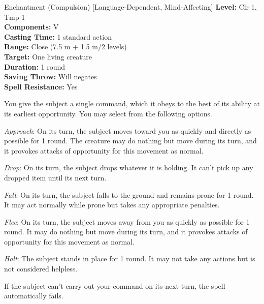 {Enchantment (Compulsion) [Language-Dependent, Mind-Affecting]}
{
	\textbf{Level:}
	Clr 1, Tmp 1\\
	\textbf{Components:}
	V\\
	\textbf{Casting Time:}
	1 standard action\\
	\textbf{Range:}
	Close (7.5 m + 1.5 m/2 levels)\\
	\textbf{Target:}
	One living creature\\
	\textbf{Duration:}
	1 round\\
	\textbf{Saving Throw:}
	Will negates\\
	\textbf{Spell Resistance:}
	Yes\\
}
{
	You give the subject a single command, which it obeys to the best of its ability at its earliest opportunity. You may select from the following options.

	\textit{Approach}:
	On its turn, the subject moves toward you as quickly and directly as possible for 1 round. The creature may do nothing but move during its turn, and it provokes attacks of opportunity for this movement as normal.

	\textit{Drop}:
	On its turn, the subject drops whatever it is holding. It can't pick up any dropped item until its next turn.

	\textit{Fall}:
	On its turn, the subject falls to the ground and remains prone for 1 round. It may act normally while prone but takes any appropriate penalties.

	\textit{Flee}:
	On its turn, the subject moves away from you as quickly as possible for 1 round. It may do nothing but move during its turn, and it provokes attacks of opportunity for this movement as normal.

	\textit{Halt}:
	The subject stands in place for 1 round. It may not take any actions but is not considered helpless.

	If the subject can't carry out your command on its next turn, the spell automatically fails.

}
